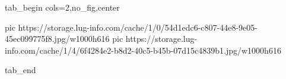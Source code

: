  
 
 
 
 


\ifcmt
  tab_begin cols=2,no_fig,center

     pic https://storage.lug-info.com/cache/1/0/54d1edc6-c807-44e8-9e05-45ec099775f8.jpg/w1000h616
		 pic https://storage.lug-info.com/cache/1/4/6f4284e2-b8d2-40c5-b45b-07d15c4839b1.jpg/w1000h616

  tab_end
\fi
